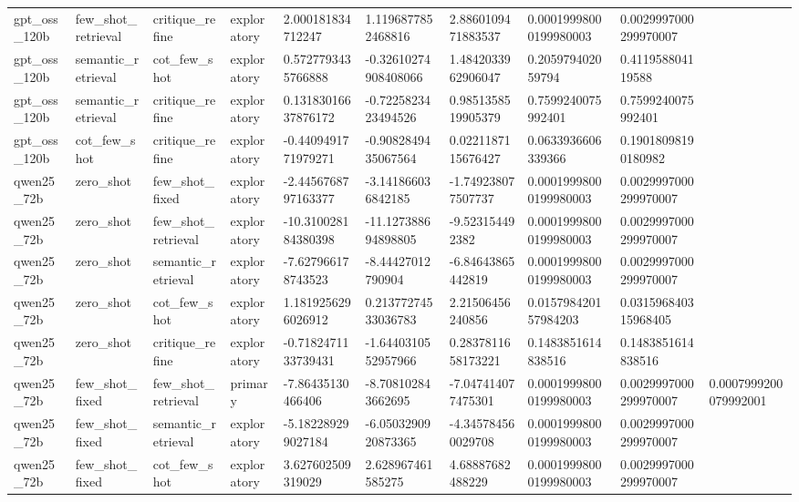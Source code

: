 \begin{tabular}{llllllllll}
gpt\_oss\_120b & few\_shot\_retrieval & critique\_refine & exploratory & 2.000181834712247 & 1.1196877852468816 & 2.8860109471883537 & 0.00019998000199980003 & 0.0029997000299970007 &  \\
gpt\_oss\_120b & semantic\_retrieval & cot\_few\_shot & exploratory & 0.5727793435766888 & -0.32610274908408066 & 1.4842033962906047 & 0.205979402059794 & 0.411958804119588 &  \\
gpt\_oss\_120b & semantic\_retrieval & critique\_refine & exploratory & 0.13183016637876172 & -0.7225823423494526 & 0.9851358519905379 & 0.7599240075992401 & 0.7599240075992401 &  \\
gpt\_oss\_120b & cot\_few\_shot & critique\_refine & exploratory & -0.4409491771979271 & -0.9082849435067564 & 0.0221187115676427 & 0.0633936606339366 & 0.19018098190180982 &  \\
qwen25\_72b & zero\_shot & few\_shot\_fixed & exploratory & -2.4456768797163377 & -3.141866036842185 & -1.749238077507737 & 0.00019998000199980003 & 0.0029997000299970007 &  \\
qwen25\_72b & zero\_shot & few\_shot\_retrieval & exploratory & -10.310028184380398 & -11.127388694898805 & -9.523154492382 & 0.00019998000199980003 & 0.0029997000299970007 &  \\
qwen25\_72b & zero\_shot & semantic\_retrieval & exploratory & -7.627966178743523 & -8.44427012790904 & -6.84643865442819 & 0.00019998000199980003 & 0.0029997000299970007 &  \\
qwen25\_72b & zero\_shot & cot\_few\_shot & exploratory & 1.1819256296026912 & 0.21377274533036783 & 2.21506456240856 & 0.015798420157984203 & 0.031596840315968405 &  \\
qwen25\_72b & zero\_shot & critique\_refine & exploratory & -0.7182471133739431 & -1.6440310552957966 & 0.2837811658173221 & 0.1483851614838516 & 0.1483851614838516 &  \\
qwen25\_72b & few\_shot\_fixed & few\_shot\_retrieval & primary & -7.86435130466406 & -8.708102843662695 & -7.047414077475301 & 0.00019998000199980003 & 0.0029997000299970007 & 0.0007999200079992001 \\
qwen25\_72b & few\_shot\_fixed & semantic\_retrieval & exploratory & -5.182289299027184 & -6.0503290920873365 & -4.345784560029708 & 0.00019998000199980003 & 0.0029997000299970007 &  \\
qwen25\_72b & few\_shot\_fixed & cot\_few\_shot & exploratory & 3.627602509319029 & 2.628967461585275 & 4.68887682488229 & 0.00019998000199980003 & 0.0029997000299970007 &  \\

\end{tabular}
